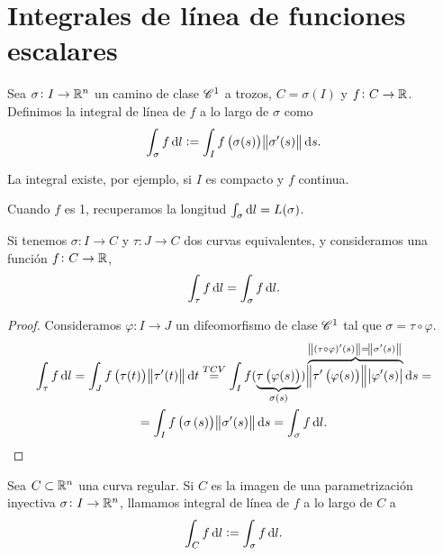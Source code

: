 \section{Integrales de línea de funciones escalares}

\begin{defi}
    Sea $\sigma \colon I \to \mathbb{R}^n$ un camino de clase $\mathscr{C}^1$ a trozos, $C = \sigma(I)$ y $f \colon C \to \mathbb{R}$. Definimos
    la integral de línea de $f$ a lo largo de $\sigma$ como
    \[
        \int_\sigma f \dif l := \int_I f\left( \sigma(s) \right) \norm{\sigma^\prime(s)} \dif s.
    \]

    La integral existe, por ejemplo, si $I$ es compacto y $f$ continua.
\end{defi}

\begin{obs}
    Cuando $f$ es 1, recuperamos la longitud $\int_\sigma \dif l = L(\sigma)$.
\end{obs}

\begin{prop}
    Si tenemos $\sigma \colon I \to C$ y $\tau \colon J \to C$ dos curvas equivalentes, y consideramos una función $f \colon C \to \mathbb{R}$,
    \[
        \int_\tau f \dif l = \int_\sigma f \dif l.
    \]
\end{prop}

\begin{proof}
    Consideramos $\varphi \colon I \to J$ un difeomorfismo de clase $\mathscr{C}^1$ tal que $\sigma = \tau \circ \varphi$.
    \begin{gather*}
        \int_\tau f \dif l = \int_J f\left( \tau(t) \right) \norm{\tau^\prime(t)} \dif t \stackrel{TCV}{=}
        \int_I f( \underbrace{\tau\left( \varphi(s) \right)}_{\sigma(s)} ) \overbrace{\norm{\tau^\prime\left( \varphi(s) \right)}
        \abs{\varphi^\prime(s)}}^{\norm{(\tau \circ \varphi)^\prime (s)} = \norm{\sigma^\prime (s)}} \dif s= \\
        = \int_I f\left( \sigma\left( s \right) \right) \norm{\sigma^\prime(s)} \dif s = \int_\sigma f \dif l.
    \end{gather*}
\end{proof}

\begin{defi}
    Sea $C \subset \mathbb{R}^n$ una curva regular. Si $C$ es la imagen de una parametrización inyectiva $\sigma \colon I \to \mathbb{R}^n$,
    llamamos integral de línea de $f$ a lo largo de $C$ a
    \[
        \int_C f \dif l := \int_\sigma f \dif l.
    \]
\end{defi}

